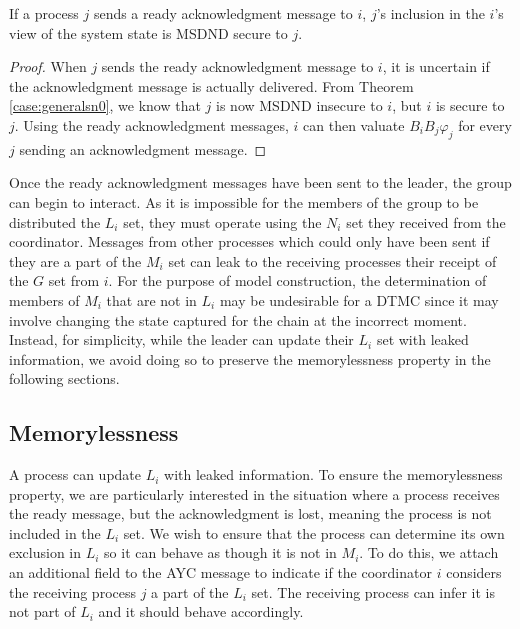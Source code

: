 \begin{thm}
    If a process $j$ sends a ready acknowledgment message to $i$, $j$'s inclusion in the $i$'s view of the system state is MSDND secure to $j$.
\end{thm}
\begin{proof}
When $j$ sends the ready acknowledgment message to $i$, it is uncertain if the acknowledgment message is actually delivered.
From Theorem \ref{case:generalsn0}, we know that $j$ is now MSDND insecure to $i$, but $i$ is secure to $j$.
Using the ready acknowledgment messages, $i$ can then valuate $B_i B_j \varphi_j$ for every $j$ sending an acknowledgment message.
\end{proof}

Once the ready acknowledgment messages have been sent to the leader, the group can begin to interact.
As it is impossible for the members of the group to be distributed the $L_i$ set, they must operate using the $N_i$ set they received from the coordinator.
Messages from other processes which could only have been sent if they are a part of the $M_i$ set can leak to the receiving processes their receipt of the $G$ set from $i$.
For the purpose of model construction, the determination of members of $M_i$ that are not in $L_i$ may be undesirable for a \ac{DTMC} since it may involve changing the state captured for the chain at the incorrect moment.
Instead, for simplicity, while the leader can update their $L_i$ set with leaked information, we avoid doing so to preserve the memorylessness property in the following sections.



\subsection{Memorylessness}

A process can update $L_i$ with leaked information.
To ensure the memorylessness property, we are particularly interested in the situation where a process receives the ready message, but the acknowledgment is lost, meaning the process is not included in the $L_i$ set.
We wish to ensure that the process can determine its own exclusion in $L_i$ so it can behave as though it is not in $M_i$.
To do this, we attach an additional field to the \ac{AYC} message to indicate if the coordinator $i$ considers the receiving process $j$ a part of the $L_i$ set.
The receiving process can infer it is not part of $L_i$ and it should behave accordingly.


